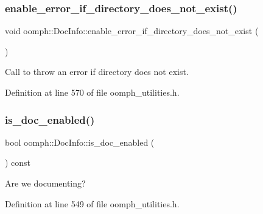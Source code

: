 \subsubsection{\texorpdfstring{enable\+\_\+error\+\_\+if\+\_\+directory\+\_\+does\+\_\+not\+\_\+exist()}{enable\_error\_if\_directory\_does\_not\_exist()}}
{\footnotesize\ttfamily void oomph\+::\+Doc\+Info\+::enable\+\_\+error\+\_\+if\+\_\+directory\+\_\+does\+\_\+not\+\_\+exist (\begin{DoxyParamCaption}{ }\end{DoxyParamCaption})\hspace{0.3cm}{\ttfamily [inline]}}



Call to throw an error if directory does not exist. 



Definition at line 570 of file oomph\+\_\+utilities.\+h.

\mbox{\label{classoomph_1_1DocInfo_a2ce90cf54f24b4ab523c624031fbb76b}} 
\subsubsection{\texorpdfstring{is\+\_\+doc\+\_\+enabled()}{is\_doc\_enabled()}}
{\footnotesize\ttfamily bool oomph\+::\+Doc\+Info\+::is\+\_\+doc\+\_\+enabled (\begin{DoxyParamCaption}{ }\end{DoxyParamCaption}) const\hspace{0.3cm}{\ttfamily [inline]}}



Are we documenting? 



Definition at line 549 of file oomph\+\_\+utilities.\+h.



